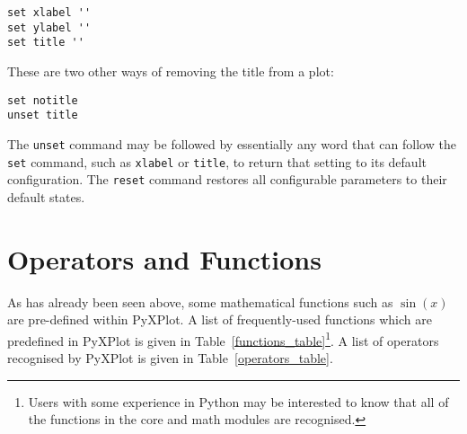\documentclass[a4paper,onecolumn,11pt]{book}
\begin{document}
\begin{verbatim}
set xlabel ''
set ylabel ''
set title ''
\end{verbatim}

\noindent These are two other ways of removing the title from a plot:

\begin{verbatim}
set notitle
unset title
\end{verbatim}

The \texttt{unset} command may be
followed by essentially any word that can follow the \texttt{set} command, such
as \texttt{xlabel} or \texttt{title}, to return that setting to its default
configuration. The \texttt{reset} command restores all configurable parameters to their default states.

\section{Operators and Functions}

As has already been seen above, some mathematical functions such as $\sin(x)$ are
pre-defined within PyXPlot. A list of frequently-used functions which are
predefined in PyXPlot is given in Table~\ref{functions_table}\footnote{Users
with some experience in Python may be interested to know that all of the
functions in the core and math modules are recognised.}. A list of
operators recognised by PyXPlot is given in Table~\ref{operators_table}.
\end{document}
